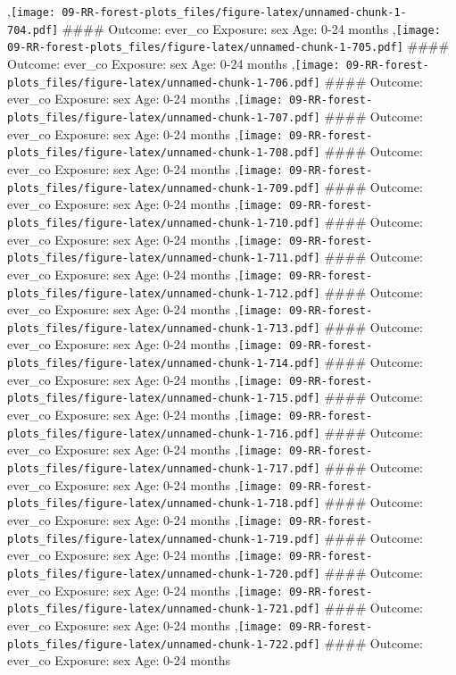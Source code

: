 \documentclass[
  9pt,
]{book}
\begin{document}
,\texttt{[image: 09-RR-forest-plots\_files/figure-latex/unnamed-chunk-1-704.pdf]}
\#\#\#\# Outcome: ever\_co Exposure: sex Age: 0-24 months
,\texttt{[image: 09-RR-forest-plots\_files/figure-latex/unnamed-chunk-1-705.pdf]}
\#\#\#\# Outcome: ever\_co Exposure: sex Age: 0-24 months
,\texttt{[image: 09-RR-forest-plots\_files/figure-latex/unnamed-chunk-1-706.pdf]}
\#\#\#\# Outcome: ever\_co Exposure: sex Age: 0-24 months
,\texttt{[image: 09-RR-forest-plots\_files/figure-latex/unnamed-chunk-1-707.pdf]}
\#\#\#\# Outcome: ever\_co Exposure: sex Age: 0-24 months
,\texttt{[image: 09-RR-forest-plots\_files/figure-latex/unnamed-chunk-1-708.pdf]}
\#\#\#\# Outcome: ever\_co Exposure: sex Age: 0-24 months
,\texttt{[image: 09-RR-forest-plots\_files/figure-latex/unnamed-chunk-1-709.pdf]}
\#\#\#\# Outcome: ever\_co Exposure: sex Age: 0-24 months
,\texttt{[image: 09-RR-forest-plots\_files/figure-latex/unnamed-chunk-1-710.pdf]}
\#\#\#\# Outcome: ever\_co Exposure: sex Age: 0-24 months
,\texttt{[image: 09-RR-forest-plots\_files/figure-latex/unnamed-chunk-1-711.pdf]}
\#\#\#\# Outcome: ever\_co Exposure: sex Age: 0-24 months
,\texttt{[image: 09-RR-forest-plots\_files/figure-latex/unnamed-chunk-1-712.pdf]}
\#\#\#\# Outcome: ever\_co Exposure: sex Age: 0-24 months
,\texttt{[image: 09-RR-forest-plots\_files/figure-latex/unnamed-chunk-1-713.pdf]}
\#\#\#\# Outcome: ever\_co Exposure: sex Age: 0-24 months
,\texttt{[image: 09-RR-forest-plots\_files/figure-latex/unnamed-chunk-1-714.pdf]}
\#\#\#\# Outcome: ever\_co Exposure: sex Age: 0-24 months
,\texttt{[image: 09-RR-forest-plots\_files/figure-latex/unnamed-chunk-1-715.pdf]}
\#\#\#\# Outcome: ever\_co Exposure: sex Age: 0-24 months
,\texttt{[image: 09-RR-forest-plots\_files/figure-latex/unnamed-chunk-1-716.pdf]}
\#\#\#\# Outcome: ever\_co Exposure: sex Age: 0-24 months
,\texttt{[image: 09-RR-forest-plots\_files/figure-latex/unnamed-chunk-1-717.pdf]}
\#\#\#\# Outcome: ever\_co Exposure: sex Age: 0-24 months
,\texttt{[image: 09-RR-forest-plots\_files/figure-latex/unnamed-chunk-1-718.pdf]}
\#\#\#\# Outcome: ever\_co Exposure: sex Age: 0-24 months
,\texttt{[image: 09-RR-forest-plots\_files/figure-latex/unnamed-chunk-1-719.pdf]}
\#\#\#\# Outcome: ever\_co Exposure: sex Age: 0-24 months
,\texttt{[image: 09-RR-forest-plots\_files/figure-latex/unnamed-chunk-1-720.pdf]}
\#\#\#\# Outcome: ever\_co Exposure: sex Age: 0-24 months
,\texttt{[image: 09-RR-forest-plots\_files/figure-latex/unnamed-chunk-1-721.pdf]}
\#\#\#\# Outcome: ever\_co Exposure: sex Age: 0-24 months
,\texttt{[image: 09-RR-forest-plots\_files/figure-latex/unnamed-chunk-1-722.pdf]}
\#\#\#\# Outcome: ever\_co Exposure: sex Age: 0-24 months
\end{document}
